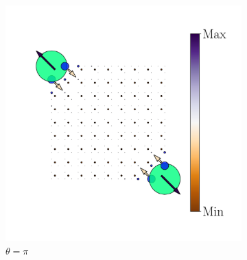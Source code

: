 \begin{figure}[h!]
\begin{minipage}[h!]{1.1\textwidth}
\begin{subfigure}[b!]{0.2 \textwidth}
         \end{subfigure}\hspace*{-0.5em}
          \begin{subfigure}[b!]{0.2 \textwidth}
             \caption*{$\theta = \pi$}
             \includegraphics[width=\textwidth]{Imagenes/Resultados_pump_Cuadrado/xy/hoti_pomp_xy_neg5.pdf}
         \end{subfigure}\hspace*{-0.5em}
     \end{minipage}\vspace*{-1em}
     
    \caption{}
    \label{fig:Proy_pump_xy}
\end{figure}